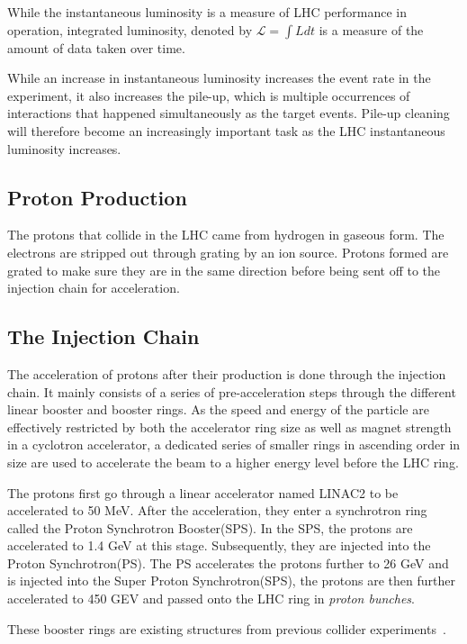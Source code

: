 While the instantaneous luminosity is a measure of LHC performance in operation, integrated luminosity, denoted by $\mathcal{L} = \int L dt$ is a measure of the amount of data taken over time.

While an increase in instantaneous luminosity increases the event rate in the experiment, it also increases the pile-up, which is multiple occurrences of interactions that happened simultaneously as the target events. Pile-up cleaning will therefore become an increasingly important task as the LHC instantaneous luminosity increases.

\subsection{Proton Production}
The protons that collide in the LHC came from hydrogen in gaseous form. The electrons are stripped out through grating by an ion source. Protons formed are grated to make sure they are in the same direction before being sent off to the injection chain for acceleration. 

\subsection{The Injection Chain}
The acceleration of protons after their production is done through the injection chain. It mainly consists of a series of pre-acceleration steps through the different linear booster and booster rings. As the speed and energy of the particle are effectively restricted by both the accelerator ring size as well as magnet strength in a cyclotron accelerator, a dedicated series of smaller rings in ascending order in size are used to accelerate the beam to a higher energy level before the LHC ring.

The protons first go through a linear accelerator named LINAC2 to be accelerated to 50 MeV. After the acceleration, they enter a synchrotron ring called the Proton Synchrotron Booster(SPS). In the SPS, the protons are accelerated to 1.4 GeV at this stage. Subsequently, they are injected into the Proton Synchrotron(PS). The PS accelerates the protons further to 26 GeV and is injected into the Super Proton Synchrotron(SPS), the protons are then further accelerated to 450 GEV and passed onto the LHC ring in \textit{proton bunches}.

These booster rings are existing structures from previous collider experiments~\cite{ATLAS:1999vwa}.

